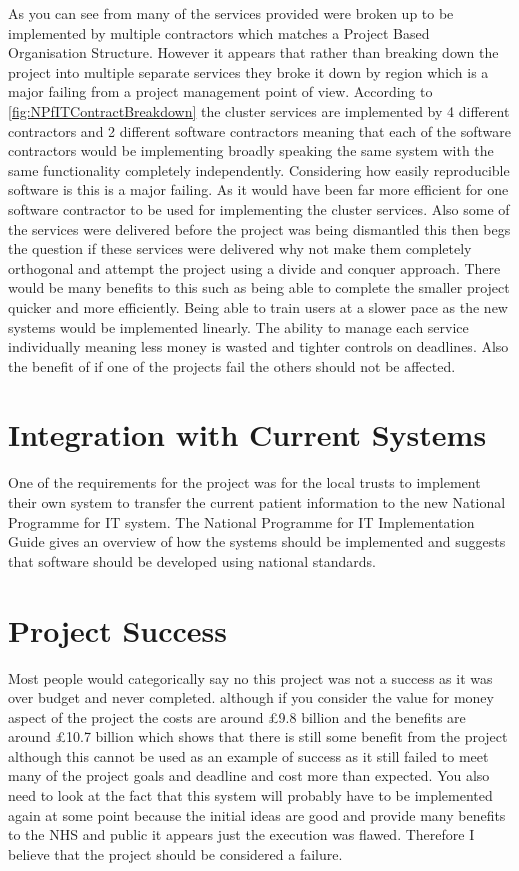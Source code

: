 \documentclass[a4paper,12pt]{scrartcl}
\begin{document}
{		As you can see from  many of the services provided were broken up to be implemented by multiple contractors which matches a Project Based Organisation Structure. However it appears that rather than breaking down the project into multiple separate services they broke it down by region which is a major failing from a project management point of view. According to \cref{fig:NPfITContractBreakdown} the cluster services are implemented by 4 different contractors and 2 different software contractors meaning that each of the software contractors would be implementing broadly speaking the same system with the same functionality completely independently. Considering how easily reproducible software is this is a major failing. As it would have been far more efficient for one software contractor to be used for implementing the cluster services. Also some of the services were delivered before the project was being dismantled\cite{Charette2011} this then begs the question if these services were delivered why not make them completely orthogonal and attempt the project using a divide and conquer approach. There would be many benefits to this such as being able to complete the smaller project quicker and more efficiently. Being able to train users at a slower pace as the new systems would be implemented linearly. The ability to manage each service individually meaning less money is wasted and tighter controls on deadlines. Also the benefit of if one of the projects fail the others should not be affected.
	}
	\section{Integration with Current Systems}
	{
		One of the requirements for the project was for the local trusts to implement their own system to transfer the current patient information to the new National Programme for IT system. The National Programme for IT Implementation Guide\cite{HealthImplementationGuidanceteam2007} gives an overview of how the systems should be implemented and suggests that software should be developed using national standards.
	}
	\section{Project Success}
	{
		Most people would categorically say no this project was not a success as it was over budget and never completed. although if you consider the value for money aspect of the project the costs are around £9.8 billion and the benefits are around £10.7 billion\cite{Campion-Awwad2014} which shows that there is still some benefit from the project although this cannot be used as an example of success as it still failed to meet many of the project goals and deadline and cost more than expected. You also need to look at the fact that this system will probably have to be implemented again at some point because the initial ideas are good and provide many benefits to the NHS and public it appears just the execution was flawed. Therefore I believe that the project should be considered a failure.
	}
\end{document}
